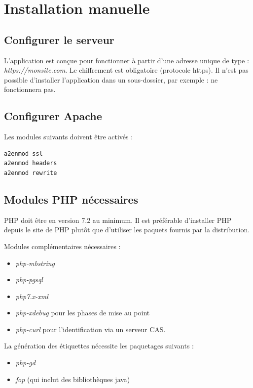 \section{Installation manuelle}
\subsection{Configurer le serveur}

L'application est conçue pour fonctionner à partir d'une adresse unique de type : {\NoAutoSpacing\textit{https://monsite.com}}. Le chiffrement est obligatoire (protocole https). Il n'est pas possible d'installer l'application dans un sous-dossier, par exemple :  ne fonctionnera pas.


\subsection{Configurer Apache}
Les modules suivants doivent être activés :
\begin{lstlisting}
a2enmod ssl
a2enmod headers
a2enmod rewrite
\end{lstlisting}

\subsection{Modules PHP nécessaires}
PHP doit être en version 7.2 au minimum. Il est préférable d'installer PHP depuis le site de PHP plutôt que d'utiliser les paquets fournis par la distribution.

Modules complémentaires nécessaires :
\begin{itemize}
\item \textit{php-mbstring}
\item \textit{php-pgsql}
\item \textit{php7.x-xml} 
\item \textit{php-xdebug} pour les phases de mise au point
\item \textit{php-curl} pour l'identification via un serveur CAS.
\end{itemize}
La génération des étiquettes nécessite les paquetages suivants :
\begin{itemize}
\item \textit{php-gd} 
\item \textit{fop} (qui inclut des bibliothèques java)
\end{itemize}

